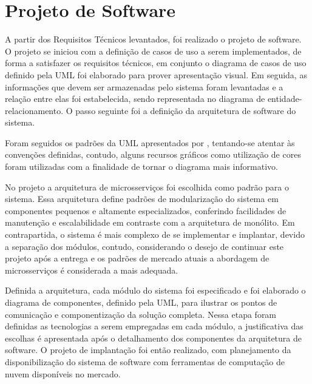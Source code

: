 \section{Projeto de Software}


A partir dos Requisitos Técnicos levantados, foi realizado o projeto de software. O projeto se iniciou com a definição de casos de uso a serem implementados, de forma a satisfazer os requisitos técnicos, em conjunto o diagrama de casos de uso definido pela UML foi elaborado para prover apresentação visual. Em seguida, as informações que devem ser armazenadas pelo sistema foram levantadas e a relação entre elas foi estabelecida, sendo representada no diagrama de entidade-relacionamento. O passo seguinte foi a definição da arquitetura de software do sistema.


Foram seguidos os padrões da UML apresentados por , tentando-se atentar às convenções definidas, contudo, alguns recursos gráficos como utilização de cores foram utilizadas com a finalidade de tornar o diagrama mais informativo.


No projeto a arquitetura de microsserviços foi escolhida como padrão para o sistema. Essa arquitetura define padrões de modularização do sistema em componentes pequenos e altamente especializados, conferindo facilidades de manutenção e escalabilidade em contraste com a arquitetura de monólito. Em contrapartida, o sistema é mais complexo de se implementar e implantar, devido a separação dos módulos, contudo, considerando o desejo de continuar este projeto após a entrega e os padrões de mercado atuais a abordagem de microsserviços é considerada a mais adequada. 

Definida a arquitetura, cada módulo do sistema foi especificado e foi elaborado o diagrama de componentes, definido pela UML, para ilustrar os pontos de comunicação e componentização da solução completa. Nessa etapa foram definidas as tecnologias a serem empregadas em cada módulo, a justificativa das escolhas é apresentada após o detalhamento dos componentes da arquitetura de software. O projeto de implantação foi então realizado, com planejamento da disponibilização do sistema de software com ferramentas de computação de nuvem disponíveis no mercado.


